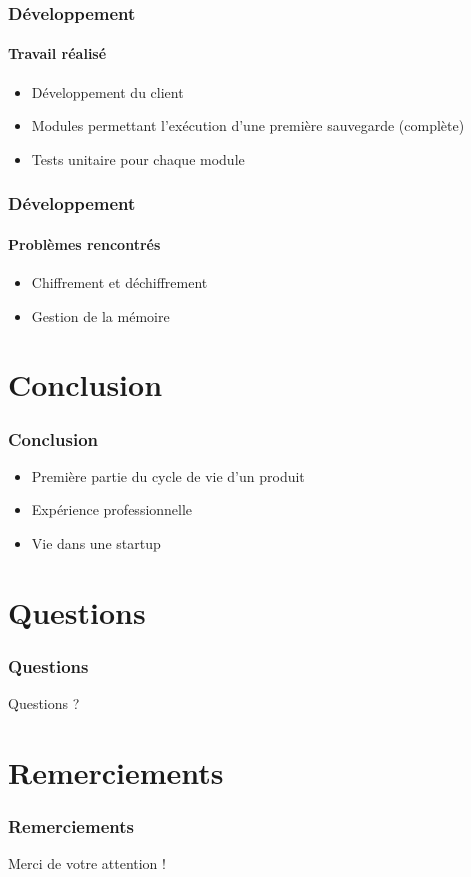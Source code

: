 \documentclass{beamer}
\begin{document}
\begin{frame}
 \frametitle{D\'eveloppement}
 \framesubtitle{Travail r\'ealis\'e}
 \begin{itemize}
  \item D\'eveloppement du client
  \item Modules permettant l'ex\'ecution d'une premi\`ere sauvegarde
  (compl\`ete)
  \item Tests unitaire pour chaque module
 \end{itemize}
\end{frame}

\begin{frame}
 \frametitle{D\'eveloppement}
 \framesubtitle{Probl\`emes rencontr\'es}
 \begin{itemize}
  \item Chiffrement et d\'echiffrement
  \item Gestion de la m\'emoire
 \end{itemize}
\end{frame}

\section{Conclusion}
\begin{frame}
 \frametitle{Conclusion}
 \begin{itemize}
  \item Première partie du cycle de vie d'un produit
  \item Expérience professionnelle 
  \item Vie dans une startup
 \end{itemize}
\end{frame}


\section*{Questions}
\begin{frame}
\frametitle{Questions}
Questions ?
\end{frame}

\section*{Remerciements}
\begin{frame}
 \frametitle{Remerciements}
 Merci de votre attention !
\end{frame}
\end{document}
